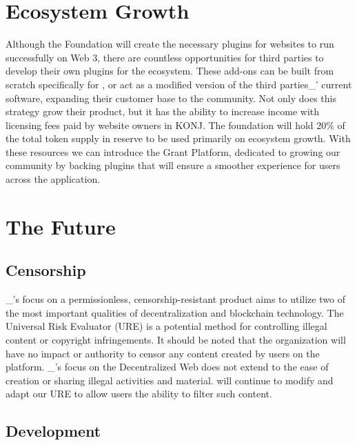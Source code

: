 \documentclass{kwp-builder}
\begin{document}

\section{Ecosystem Growth}

\tab Although the \konjure Foundation will create the necessary plugins for websites to run successfully on Web 3, there are countless opportunities for third parties to develop their own plugins for the ecosystem. These add-ons can be built from scratch specifically for \konjure, or act as a modified version of the third parties\_{’} current software, expanding their customer base to the \konjure community. Not only does this strategy grow their product, but it has the ability to increase income with licensing fees paid by website owners in KONJ. The foundation will hold 20\% of the total token supply in reserve to be used primarily on ecosystem growth. With these resources we can introduce the \konjure Grant Platform, dedicated to growing our community by backing plugins that will ensure a smoother experience for users across the application.


\newpage

\section{The Future}
\subsection{Censorship}

\tab \konjure\_{’}s focus on a permissionless, censorship-resistant product aims to utilize two of the most important qualities of decentralization and blockchain technology. The Universal Risk Evaluator (URE) is a potential method for controlling illegal content or copyright infringements. It should be noted that the \konjure organization will have no impact or authority to censor any content created by users on the platform. \konjure\_{’}s focus on the Decentralized Web does not extend to the ease of creation or sharing illegal activities and material. \konjure will continue to modify and adapt our URE to allow users the ability to filter such content.

\subsection{Development}
\end{document}
